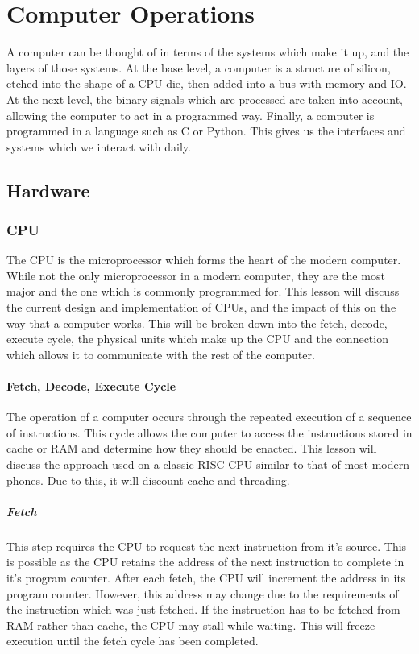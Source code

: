 \chapter{Computer Operations}
	\label{ch:ComputerOperations}
	A computer can be thought of in terms of the systems which make it up, and the layers of those systems.
	At the base level, a computer is a structure of silicon, etched into the shape of a CPU die, then added into a bus with memory and IO.
	At the next level, the binary signals which are processed are taken into account, allowing the computer to act in a programmed way. 
	Finally, a computer is programmed in a language such as C or Python. This gives us the interfaces and systems which we interact with daily. 
	\section{Hardware}
		\subsection{CPU} 
			The CPU is the microprocessor which forms the heart of the modern computer. 
			While not the only microprocessor in a modern computer, they are the most major and the one which is commonly programmed for. 
			This lesson will discuss the current design and implementation of CPUs, and the impact of this on the way that a computer works. 
			This will be broken down into the fetch, decode, execute cycle, the physical units which make up the CPU and the connection which allows it to communicate with the rest of the computer. 
			\subsubsection{Fetch, Decode, Execute Cycle}
				The operation of a computer occurs through the repeated execution of a sequence of instructions.
				This cycle allows the computer to access the instructions stored in cache or RAM and determine how they should be enacted. This lesson will discuss the approach used on a classic RISC CPU similar to that of most modern phones. 
				Due to this, it will discount cache and threading. 
				\paragraph{Fetch}
					This step requires the CPU to request the next instruction from it's source. 
					This is possible as the CPU retains the address of the next instruction to complete in it's program counter. 
					After each fetch, the CPU will increment the address in its program counter. 
					However, this address may change due to the requirements of the instruction which was just fetched. 
					If the instruction has to be fetched from RAM rather than cache, the CPU may stall while waiting.
					This will freeze execution until the fetch cycle has been completed. 
